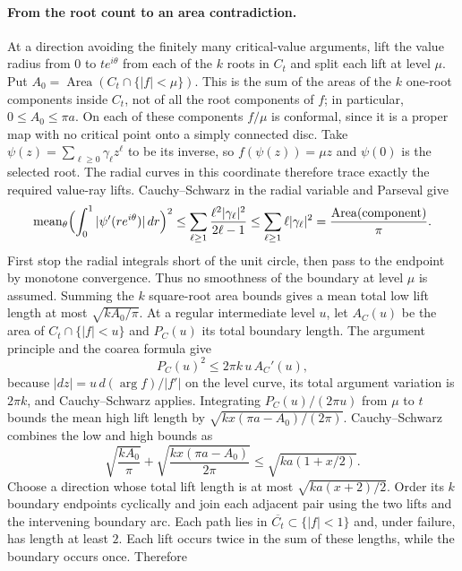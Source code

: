 \paragraph{From the root count to an area contradiction.}
At a direction avoiding the finitely many critical-value arguments, lift the
value radius from $0$ to $te^{i\theta}$ from each of the $k$ roots in $C_t$
and split each lift at level $\mu$. Put
$A_0=\operatorname{Area}(C_t\cap\{|f|<\mu\})$. This is the sum of the
areas of the $k$ one-root components inside $C_t$, not of all the root
components of $f$; in particular, $0\le A_0\le\pi a$.
On each of these components $f/\mu$ is conformal, since it is a proper
map with no critical point onto a simply connected disc. Take
$\psi(z)=\sum_{\ell\ge0}\gamma_\ell z^\ell$ to be its inverse, so
$f(\psi(z))=\mu z$ and $\psi(0)$ is the selected root. The radial curves in
this coordinate therefore trace exactly the required value-ray lifts. Cauchy--Schwarz
in the radial variable and Parseval give
\[
 \operatorname{mean}_\theta
   \Bigl(\int_0^1|\psi'(re^{i\theta})|\,dr\Bigr)^2
 \le\sum_{\ell\ge1}\frac{\ell^2|\gamma_\ell|^2}{2\ell-1}
 \le\sum_{\ell\ge1}\ell|\gamma_\ell|^2
 =\frac{\operatorname{Area}(\text{component})}\pi.
\]
First stop the radial integrals short of the unit circle, then pass to
the endpoint by monotone convergence. Thus no smoothness
of the boundary at level $\mu$ is assumed. Summing the $k$ square-root
area bounds gives a mean total low lift length at most $\sqrt{kA_0/\pi}$.
At a regular intermediate level $u$, let $A_C(u)$ be the area of
$C_t\cap\{|f|<u\}$ and $P_C(u)$ its total boundary length.
The argument principle and the coarea formula give
\begin{equation}\label{eq:lc-perimeter}
 P_C(u)^2\le2\pi k\,u\,A_C'(u),
\end{equation}
because $|dz|=u\,d(\arg f)/|f'|$ on the level curve, its total argument
variation is $2\pi k$, and Cauchy--Schwarz applies.  Integrating
$P_C(u)/(2\pi u)$ from $\mu$ to $t$ bounds the mean high lift length by
$\sqrt{kx(\pi a-A_0)/(2\pi)}$. Cauchy--Schwarz combines the low and high
bounds as
\[
 \sqrt{\frac{kA_0}{\pi}}+
 \sqrt{\frac{kx(\pi a-A_0)}{2\pi}}
 \le\sqrt{ka(1+x/2)}.
\]
Choose a direction whose total lift length is at most
$\sqrt{ka(x+2)/2}$. Order its $k$ boundary endpoints cyclically and
join each adjacent pair using the two lifts and the intervening boundary
arc. Each path lies in $\overline{C_t}\subset\{|f|<1\}$ and, under
failure, has length at least $2$. Each lift occurs twice in the sum of
these lengths, while the boundary occurs once. Therefore
